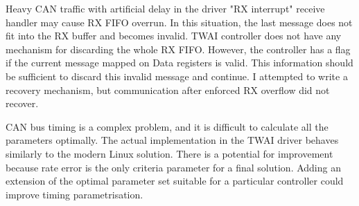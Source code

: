\documentclass{ctuthesis}
\begin{document}
 \quad 
 Heavy CAN traffic with artificial delay in the driver "RX interrupt" receive handler may cause RX FIFO overrun. In this situation, the last message does not fit into the RX buffer and becomes invalid. TWAI controller does not have any mechanism for discarding the whole RX FIFO. However, the controller has a flag if the current message mapped on Data registers is valid. This information should be sufficient to discard this invalid message and continue. I attempted to write a recovery mechanism, but communication after enforced RX overflow did not recover.\newline

 \quad CAN bus timing is a complex problem, and it is difficult to calculate all the parameters optimally. The actual implementation in the TWAI driver behaves similarly to the modern Linux solution. There is a potential for improvement because rate error is the only criteria parameter for a final solution. Adding an extension of the optimal parameter set suitable for a particular controller could improve timing parametrisation.
 
\end{document}
